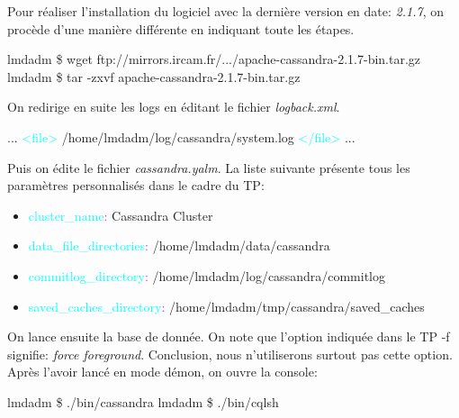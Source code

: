 \par Pour réaliser l'installation du logiciel avec la dernière version en date: \textit{2.1.7},\newline
on procède d'une manière différente en indiquant toute les étapes.\newline
\begin{tt}
lmdadm \$ wget ftp://mirrors.ircam.fr/.../apache-cassandra-2.1.7-bin.tar.gz \newline
lmdadm \$ tar -zxvf apache-cassandra-2.1.7-bin.tar.gz \newline
\end{tt}
On redirige en suite les logs en éditant le fichier \textit{logback.xml}. \newline
\begin{tt}
... \newline
\textcolor{cyan}{<file>} /home/lmdadm/log/cassandra/system.log \textcolor{cyan}{</file>} \newline
... \newline
\end{tt}
Puis on édite le fichier \textit{cassandra.yalm}. La liste suivante présente tous les paramètres personnalisés dans le cadre du TP:
\begin{itemize}
\item \textcolor{cyan}{cluster\_name}\textcolor{magenta}{:} Cassandra Cluster
\item \textcolor{cyan}{data\_file\_directories}\textcolor{magenta}{:} /home/lmdadm/data/cassandra
\item \textcolor{cyan}{commitlog\_directory}\textcolor{magenta}{:} /home/lmdadm/log/cassandra/commitlog
\item \textcolor{cyan}{saved\_caches\_directory}\textcolor{magenta}{:} /home/lmdadm/tmp/cassandra/saved\_caches
\end{itemize}
On lance ensuite la base de donnée. On note que l'option indiquée dans le TP -f
signifie: \textit{force foreground}. Conclusion, nous n'utiliserons surtout pas cette option. Après l'avoir lancé en mode démon, on ouvre la console: \newline
\begin{tt}
lmdadm \$ ./bin/cassandra \newline
lmdadm \$ ./bin/cqlsh \newline
\end{tt}
